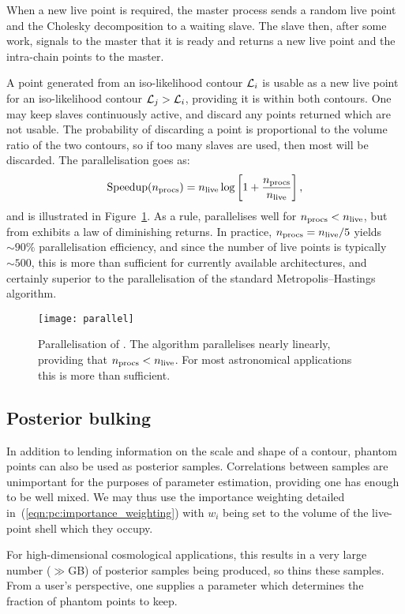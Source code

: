 When a new live point is required, the master process sends a random live point and the Cholesky decomposition to a waiting slave.  The slave then, after some work, signals to the master that it is ready and returns a new live point and the intra-chain points to the master.

A point generated from an iso-likelihood contour $\mathcal{L}_i$ is usable as a new live point for an iso-likelihood contour $\mathcal{L}_j>\mathcal{L}_i$, providing it is within both contours.  One may keep slaves continuously active, and discard any points returned which are not usable.  The probability of discarding a point is proportional to the volume ratio of the two contours, so if too many slaves are used, then most will be discarded.  The parallelisation goes as:
\begin{equation}
  \text{Speedup}(n_{\mathrm{procs}}) = n_{\mathrm{live}}\log\left[ 1 + \frac{n_{\mathrm{procs}}}{n_{\mathrm{live}}} \right],
  \label{eqn:pc:parallel}
\end{equation}
and is illustrated in Figure~\ref{fig:pc:parallel}. 
As a rule, \PolyChord{} parallelises well for $n_{\mathrm{procs}}<n_{\mathrm{live}}$, but from exhibits a law of diminishing returns. In practice, $n_{\mathrm{procs}} = n_{\mathrm{live}}/5$ yields $\sim90\%$ parallelisation efficiency, and
since the number of live points is typically $\sim500$, this is more than sufficient for currently available \openMPI{} architectures, and certainly superior to the parallelisation of the standard Metropolis--Hastings algorithm.
%
\begin{figure}
  \centering
  \texttt{[image: parallel]}
  \caption{%
Parallelisation of \PolyChord{}. 
The algorithm parallelises nearly linearly, providing that $n_{\mathrm{procs}}<n_{\mathrm{live}}$. For most astronomical applications this is more than sufficient.\label{fig:pc:parallel}}
\end{figure}
%
\subsection{Posterior bulking}
\label{sec:pc:posterior_bulking}
In addition to lending information on the scale and shape of a contour, phantom points can also be used as posterior samples. Correlations between samples are unimportant for the purposes of parameter estimation, providing one has enough to be well mixed. We may thus use the importance weighting detailed in~(\ref{eqn:pc:importance_weighting}) with $w_i$ being set to the volume of the live-point shell which they occupy.

For high-dimensional cosmological applications, this results in a very large number ($\gg$GB) of posterior samples being produced, so \PolyChord{} thins these samples. From a user's perspective, one supplies a parameter which determines the fraction of phantom points to keep.

